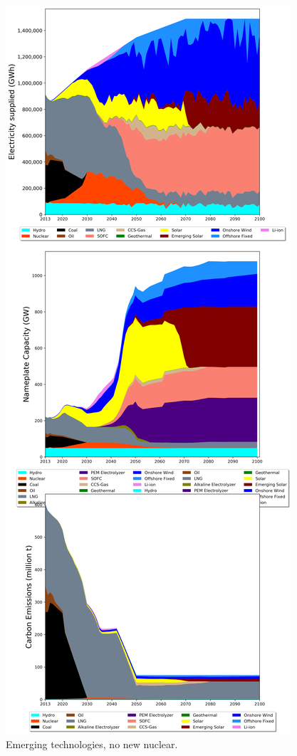 \begin{figure}[h] 
\centering
\label{scen3}
\includegraphics[scale=0.3]{figures/newtechs_nonuc}
\caption{Emerging technologies, no new nuclear.}
\end{figure}

